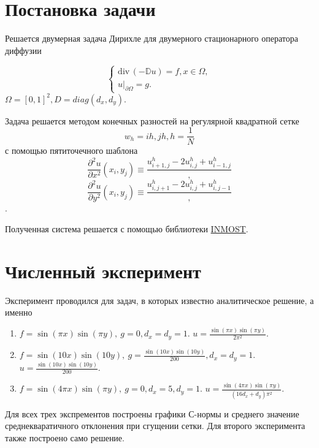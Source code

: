 \documentclass{report}
\newcommand{\divg}{\mathrm{div}\,}
\begin{document}
	
\section{Постановка задачи}
Решается двумерная задача Дирихле для двумерного стационарного оператора диффузии

$$
\begin{cases}
    \divg(-\mathbb{D} u) = f, x \in \Omega, \\
    u|_{\partial \Omega} = g.
\end{cases}
$$
$
    \Omega = [0,1]^2, D = diag(d_x, d_y).
$

Задача решается методом конечных разностей на регулярной квадратной сетке
\[
    w_h = {ih, jh}, h = \frac{1}{N}
\]
с помощью пятиточечного шаблона
\[
    \frac{\partial^2 u}{\partial x^2}(x_i, y_j) \equiv \frac{u^h_{i+1,j} - 2u^h_{i,j} + u^h_{i-1,j}},
\]
\[
    \frac{\partial^2 u}{\partial y^2}(x_i, y_j) \equiv \frac{u^h_{i,j+1} - 2u^h_{i,j} + u^h_{i,j-1}},
\].

Полученная система решается с помощью библиотеки \href{https://github.com/INMOST-DEV/INMOST}{INMOST}.


\section{Численный эксперимент}

Эксперимент проводился для задач, в которых известно аналитическое решение, а именно
\begin{enumerate}
	\item $f = \sin(\pi x) \sin(\pi y),~ g = 0, d_x = d_y = 1$. $u = \frac{\sin(\pi x) \sin(\pi y)}{2 \pi^2}$.
	\item $f = \sin(10 x) \sin(10 y), ~ g = \frac{\sin(10 x) \sin(10 y)}{200} , d_x = d_y = 1$. $u = \frac{\sin(10 x) \sin(10 y)}{200}$.
	\item $f = \sin(4 \pi x) \sin(\pi y), ~ g = 0, d_x = 5, d_y = 1$. $u = \frac{\sin(4 \pi x) \sin(\pi y)}{(16d_x + d_y)\pi^2}$.
\end{enumerate}

Для всех трех экспрементов построены графики С-нормы и среднего значение среднекваратичного отклонения при сгущении сетки.
Для второго эксперимента также построено само решение.
\end{document}
